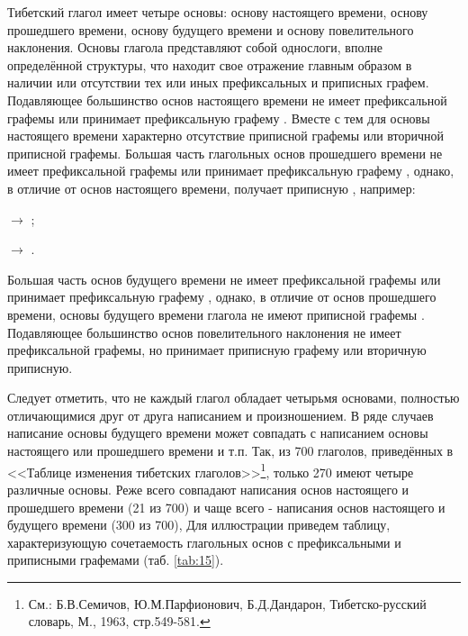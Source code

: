 Тибетский глагол имеет четыре основы: основу настоящего времени, основу прошедшего времени, основу будущего времени и основу повелительного наклонения. Основы глагола представляют собой однослоги, вполне определённой структуры, что находит свое отражение главным образом в наличии или отсутствии тех или иных префиксальных и приписных графем. Подавляющее большинство основ настоящего времени не имеет префиксальной графемы или принимает префиксальную графему . Вместе с тем для основы настоящего времени характерно отсутствие приписной графемы  или вторичной приписной графемы. Большая часть глагольных основ прошедшего времени не имеет префиксальной графемы или принимает префиксальную графему , однако, в отличие от основ настоящего времени, получает приписную , например:
\begin{prfsample}
	\item {} $\rightarrow$ ;
	\item {} $\rightarrow$ .
\end{prfsample}
Большая часть основ будущего времени не имеет префиксальной графемы или принимает префиксальную графему , однако, в отличие от основ прошедшего времени, основы будущего времени глагола не имеют приписной графемы . Подавляющее большинство основ повелительного наклонения не имеет префиксальной графемы, но принимает приписную графему  или вторичную приписную.

Следует отметить, что не каждый глагол обладает четырьмя основами, полностью отличающимися друг от друга написанием и произношением. В ряде случаев написание основы будущего времени может совпадать с написанием основы настоящего или прошедшего времени и т.п. Так, из 700 глаголов, приведённых в <<Таблице изменения тибетских
глаголов>>\footnote[33]{См.: Б.В.Семичов, Ю.М.Парфионович, Б.Д.Дандарон, Тибетско-русский словарь, М., 1963, стр.549-581.}, только 270 имеют четыре различные основы. Реже всего совпадают написания основ настоящего и прошедшего времени (21 из 700) и чаще всего - написания основ настоящего и будущего времени (300 из 700),
Для иллюстрации приведем таблицу, характеризующую сочетаемость глагольных основ с префиксальными и приписными графемами (таб. \ref{tab:15}).

